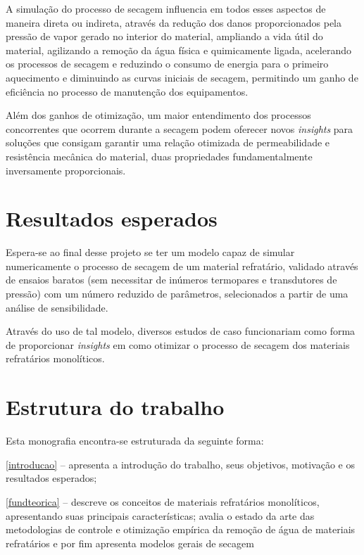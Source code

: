    A simulação do processo de secagem influencia em todos esses aspectos de
   maneira direta ou indireta, através da redução dos danos proporcionados pela
   pressão de vapor gerado no interior do material, ampliando a vida útil do
   material, agilizando a remoção da água física e quimicamente ligada, acelerando os processos de secagem e reduzindo o consumo de energia para o
   primeiro aquecimento e diminuindo as curvas iniciais de secagem, permitindo
   um ganho de eficiência no processo de manutenção dos equipamentos.

   Além dos ganhos de otimização, um maior entendimento dos processos
   concorrentes que ocorrem durante a secagem podem oferecer novos \textit{insights} para
   soluções que consigam garantir uma relação otimizada de permeabilidade e
   resistência mecânica do material, duas propriedades fundamentalmente
   inversamente proporcionais.


\section{Resultados esperados} \label{results-esperados}
   Espera-se ao final desse projeto se ter um modelo capaz de simular
   numericamente o processo de secagem de um material refratário, validado
   através de ensaios baratos (sem necessitar de inúmeros termopares e transdutores de
   pressão) com um número reduzido de parâmetros, selecionados a partir de uma
   análise de sensibilidade.

   Através do uso de tal modelo, diversos estudos de caso funcionariam como
   forma de proporcionar \textit{insights} em como otimizar o processo de secagem dos
   materiais refratários monolíticos.

    
\section{Estrutura do trabalho}
    
Esta monografia encontra-se estruturada da seguinte forma:
    
\autoref{introducao} – apresenta a introdução do trabalho, seus objetivos, motivação e os resultados esperados;
    
\autoref{fundteorica} – descreve os conceitos de materiais refratários
monolíticos, apresentando suas principais características; avalia o estado da
arte das metodologias de controle e otimização empírica da remoção de água de
materiais refratários e por fim apresenta modelos gerais de secagem
    
